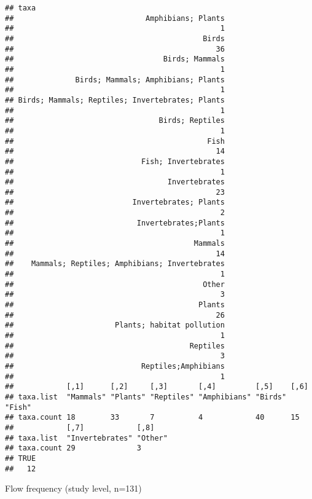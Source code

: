 \documentclass[
]{article}
\begin{document}
\begin{verbatim}
## taxa
##                              Amphibians; Plants 
##                                               1 
##                                           Birds 
##                                              36 
##                                  Birds; Mammals 
##                                               1 
##              Birds; Mammals; Amphibians; Plants 
##                                               1 
## Birds; Mammals; Reptiles; Invertebrates; Plants 
##                                               1 
##                                 Birds; Reptiles 
##                                               1 
##                                            Fish 
##                                              14 
##                             Fish; Invertebrates 
##                                               1 
##                                   Invertebrates 
##                                              23 
##                           Invertebrates; Plants 
##                                               2 
##                            Invertebrates;Plants 
##                                               1 
##                                         Mammals 
##                                              14 
##    Mammals; Reptiles; Amphibians; Invertebrates 
##                                               1 
##                                           Other 
##                                               3 
##                                          Plants 
##                                              26 
##                       Plants; habitat pollution 
##                                               1 
##                                        Reptiles 
##                                               3 
##                             Reptiles;Amphibians 
##                                               1 
##            [,1]      [,2]     [,3]       [,4]         [,5]    [,6]  
## taxa.list  "Mammals" "Plants" "Reptiles" "Amphibians" "Birds" "Fish"
## taxa.count 18        33       7          4            40      15    
##            [,7]            [,8]   
## taxa.list  "Invertebrates" "Other"
## taxa.count 29              3      
## TRUE 
##   12
\end{verbatim}

Flow frequency (study level, n=131)
\end{document}
